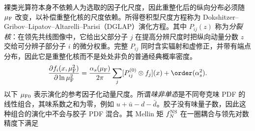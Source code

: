 裸类光算符本身不依赖人为选取的因子化尺度，因此重整化后的纵向分布必须随 $\mu_{\rm F}$ 改变，以补偿重整化核的尺度依赖。所得卷积型尺度方程称为 Dokshitzer--Gribov--Lipatov--Altarelli--Parisi（DGLAP）演化方程。其中 $P_{ij}(z)$ 称为\emph{分裂核}：在领先共线图像中，它给出父部分子 $j$ 在提高分辨尺度时把纵向动量分数 $z$ 交给可分辨子部分子 $i$ 的微分权重。完整 $P_{ij}$ 同时含实辐射和虚修正，并带有端点分布，因此它是重整化核而不是处处非负的普通经典概率密度。
\begin{equation}
 {
 \frac{\partial f_i(x,\mu_{\rm F}^2)}{\partial\ln\mu_{\rm F}^2}
 =\frac{\alpha_s(\mu_{\rm F})}{2\pi}
 \sum_j[P_{ij}^{(0)}\otimes f_j](x)
 +\order(\alpha_s^2).}
 \label{eq:dglap-general-evolution-dp68}
\end{equation}
以下 $\mu_{\rm F0}$ 表示演化的参考因子化动量尺度。所谓\emph{味非单态}是不同夸克味 PDF 的线性组合，其味系数之和为零，例如 $u+\bar u-d-\bar d$。胶子没有味量子数，因此这种组合的演化中不会与胶子 PDF 混合。其 Mellin 矩 $f_N^{\rm NS}$ 在一圈耦合与领先对数精度下满足


